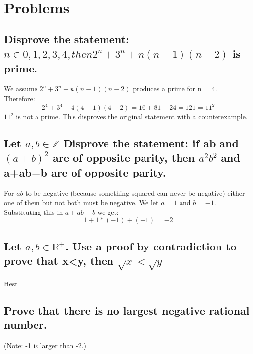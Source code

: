 \chapter{Problems}
\section{Disprove the statement: $n\in{0,1,2,3,4}, then 2^n + 3^n+n(n-1)(n-2)$ is prime.}
We assume $2^n + 3^n+n(n-1)(n-2)$ produces a prime for n = 4.\\
Therefore:
\begin{equation}
2^4+3^4+4(4-1)(4-2) = 16 + 81 + 24 = 121 = 11^2
\end{equation}
$11^2$ is not a prime.
This disproves the original statement with a counterexample.

\section{Let $a,b\in\mathbb{Z}$ Disprove the statement: if ab and $(a+b)^2$ are of opposite parity, then $a^2b^2$ and a+ab+b are of opposite parity.}
For $ab$ to be negative (because something squared can never be negative) either one of them but not both must be negative. We let $a=1$ and $b=-1$. Substituting this in $a+ab+b$ we get:
\begin{equation}
1+1*(-1)+(-1)=-2
\end{equation}

\section{Let $a,b\in\mathbb{R}^+$. Use a proof by contradiction to prove that x<y, then $\sqrt{x}<\sqrt{y}$}
Hest

\section{Prove that there is no largest negative rational number.}
(Note: -1 is larger than -2.)

